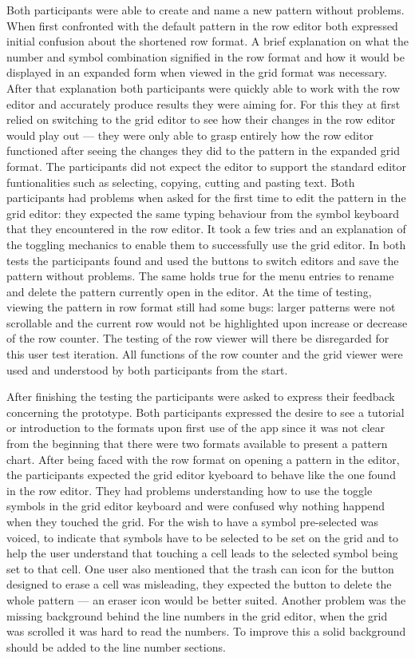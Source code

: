 Both participants were able to create and name a new pattern without problems. When first confronted with the default pattern in the row editor both expressed initial confusion about the shortened row format. A brief explanation on what the number and symbol combination signified in the row format and how it would be displayed in an expanded form when viewed in the grid format was necessary. After that explanation both participants were quickly able to work with the row editor and accurately produce results they were aiming for. For this they at first relied on switching to the grid editor to see how their changes in the row editor would play out --- they were only able to grasp entirely how the row editor functioned after seeing the changes they did to the pattern in the expanded grid format. The participants did not expect the editor to support the standard editor funtionalities such as selecting, copying, cutting and pasting text. 
Both participants had problems when asked for the first time to edit the pattern in the grid editor: they expected the same typing behaviour from the symbol keyboard that they encountered in the row editor. It took a few tries and an explanation of the toggling mechanics to enable them to successfully use the grid editor. In both tests the participants found and used the buttons to switch editors and save the pattern without problems. The same holds true for the menu entries to rename and delete the pattern currently open in the editor.
At the time of testing, viewing the pattern in row format still had some bugs: larger patterns were not scrollable and the current row would not be highlighted upon increase or decrease of the row counter. The testing of the row viewer will there be disregarded for this user test iteration. All functions of the row counter and the grid viewer were used and understood by both participants from the start. 

After finishing the testing the participants were asked to express their feedback concerning the prototype. Both participants expressed the desire to see a tutorial or introduction to the formats upon first use of the app since it was not clear from the beginning that there were two formats available to present a pattern chart. After being faced with the row format on opening a pattern in the editor, the participants expected the grid editor kyeboard to behave like the one found in the row editor. They had problems understanding how to use the toggle symbols in the grid editor keyboard and were confused why nothing happend when they touched the grid. For the wish to have a symbol pre-selected was voiced, to indicate that symbols have to be selected to be set on the grid and to help the user understand that touching a cell leads to the selected symbol being set to that cell. One user also mentioned that the trash can icon for the button designed to erase a cell was misleading, they expected the button to delete the whole pattern --- an eraser icon would be better suited. Another problem was the missing background behind the line numbers in the grid editor, when the grid was scrolled it was hard to read the numbers. To improve this a solid background should be added to the line number sections. 

